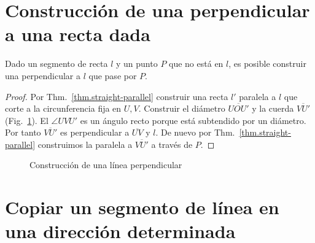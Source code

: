 {\section{Construcción de una perpendicular a una recta dada}\label{s.perp}

\begin{theorem}\label{thm.straight-perp}
Dado un segmento de recta $l$ y un punto $P$ que no está en $l$, es posible construir una perpendicular a $l$ que pase por $P$.
\end{theorem}

\begin{proof}
Por Thm.~\ref{thm.straight-parallel} construir una recta $l'$ paralela a $l$ que corte a la circunferencia fija en $U,V$. Construir el diámetro $\overline{UOU'}$ y la cuerda $\overline{VU'}$ (Fig.~\ref{f.se-perp}). El $\angle UVU'$ es un ángulo recto porque está subtendido por un diámetro. Por tanto $\overline{VU'}$ es perpendicular a $\overline{UV}$ y $l$. De nuevo por Thm.~\ref{thm.straight-parallel} construimos la paralela a $\overline{VU'}$ a través de $P$.
\end{proof}

\begin{figure}[htb]
\begin{center}
\end{center}
\caption{Construcción de una línea perpendicular}\label{f.se-perp}
\end{figure}

\section{Copiar un segmento de línea en una dirección determinada}\label{s.copy}

}
